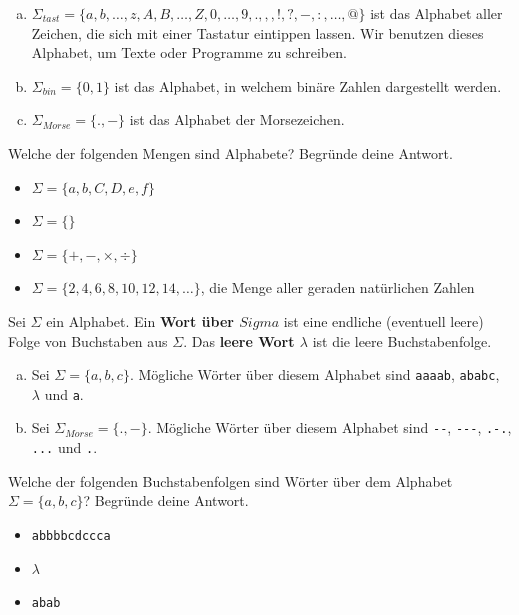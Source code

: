 \documentclass{article}
\begin{document}
\begin{example}
\begin{enumerate}[(a)]
    \item \(\Sigma_{tast} = \{a, b, \dots, z, A, B, \dots, Z, 0, \dots, 9, ., ,, !, ?, -, :, \dots, @\}\) ist das Alphabet aller Zeichen, die sich mit einer Tastatur eintippen lassen. Wir benutzen dieses Alphabet, um Texte oder Programme zu schreiben.
    \item \(\Sigma_{bin} = \{0, 1\}\) ist das Alphabet, in welchem binäre Zahlen dargestellt werden.
    \item \(\Sigma_{Morse} = \{.,-\}\) ist das Alphabet der Morsezeichen.
\end{enumerate}
\end{example}

\begin{exercise}
Welche der folgenden Mengen sind Alphabete? Begründe deine Antwort.
\begin{itemize}[label=$\square$]
    \item \(\Sigma = \{a, b, C, D, e, f\}\)
    \item \(\Sigma = \{\}\)
    \item \(\Sigma = \{+, -, \times, \div\}\)
    \item \(\Sigma = \{2, 4, 6, 8, 10, 12, 14, \dots\}\), die Menge aller geraden natürlichen Zahlen
\end{itemize}
\end{exercise}

\begin{definition}
Sei \(\Sigma\) ein Alphabet. Ein \textbf{Wort über \(Sigma\)} ist eine endliche (eventuell leere) Folge von Buchstaben aus \(\Sigma\). Das \textbf{leere Wort \(\lambda\)} ist die leere Buchstabenfolge.
\end{definition}

\begin{example}
\begin{enumerate}[(a)]
    \item Sei \(\Sigma = \{a, b, c\}\). Mögliche Wörter über diesem Alphabet sind \texttt{aaaab}, \texttt{ababc}, \(\lambda\) und \texttt{a}.
    \item Sei \(\Sigma_{Morse} = \{.,-\}\). Mögliche Wörter über diesem Alphabet sind \verb|--|, \verb|---|, \verb|.-.|, \verb|...| und \verb|.|.
\end{enumerate}
\end{example}

\begin{exercise}
Welche der folgenden Buchstabenfolgen sind Wörter über dem Alphabet \(\Sigma = \{a, b, c\}\)? Begründe deine Antwort.
\begin{itemize}[label=$\square$]
    \item \texttt{abbbbcdccca}
    \item \(\lambda\)
    \item \texttt{abab}
\end{itemize}
\end{exercise}
\end{document}
